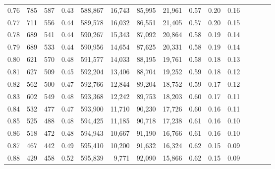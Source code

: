 \begin{tabular}{rrrcrrrrrrrrrrr}
0.76 &     785 &     587 &                                       0.43 &  588,867 &   16,743 &   85,995 &   21,961 &  0.57 &  0.20 &                         0.16 \\
0.77 &     711 &     556 &                                       0.44 &  589,578 &   16,032 &   86,551 &   21,405 &  0.57 &  0.20 &                         0.15 \\
0.78 &     689 &     541 &                                       0.44 &  590,267 &   15,343 &   87,092 &   20,864 &  0.58 &  0.19 &                         0.14 \\
0.79 &     689 &     533 &                                       0.44 &  590,956 &   14,654 &   87,625 &   20,331 &  0.58 &  0.19 &                         0.14 \\
0.80 &     621 &     570 &                                       0.48 &  591,577 &   14,033 &   88,195 &   19,761 &  0.58 &  0.18 &                         0.13 \\
0.81 &     627 &     509 &                                       0.45 &  592,204 &   13,406 &   88,704 &   19,252 &  0.59 &  0.18 &                         0.12 \\
0.82 &     562 &     500 &                                       0.47 &  592,766 &   12,844 &   89,204 &   18,752 &  0.59 &  0.17 &                         0.12 \\
0.83 &     602 &     549 &                                       0.48 &  593,368 &   12,242 &   89,753 &   18,203 &  0.60 &  0.17 &                         0.11 \\
0.84 &     532 &     477 &                                       0.47 &  593,900 &   11,710 &   90,230 &   17,726 &  0.60 &  0.16 &                         0.11 \\
0.85 &     525 &     488 &                                       0.48 &  594,425 &   11,185 &   90,718 &   17,238 &  0.61 &  0.16 &                         0.10 \\
0.86 &     518 &     472 &                                       0.48 &  594,943 &   10,667 &   91,190 &   16,766 &  0.61 &  0.16 &                         0.10 \\
0.87 &     467 &     442 &                                       0.49 &  595,410 &   10,200 &   91,632 &   16,324 &  0.62 &  0.15 &                         0.09 \\
0.88 &     429 &     458 &                                       0.52 &  595,839 &    9,771 &   92,090 &   15,866 &  0.62 &  0.15 &                         0.09 \\

\end{tabular}
